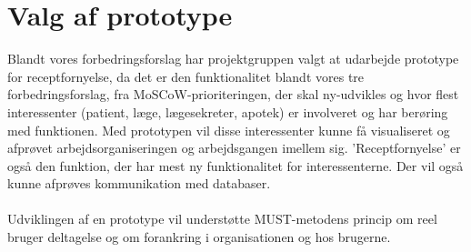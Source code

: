 \section{Valg af prototype}
Blandt vores forbedringsforslag har projektgruppen valgt at udarbejde prototype for receptfornyelse, da det er den funktionalitet blandt vores tre forbedringsforslag, fra MoSCoW-prioriteringen, der skal ny-udvikles og hvor flest interessenter (patient, læge, lægesekreter, apotek) er involveret og har berøring med funktionen. Med prototypen vil disse interessenter kunne få visualiseret og afprøvet arbejdsorganiseringen og arbejdsgangen imellem sig. ’Receptfornyelse’ er også den funktion, der har mest ny funktionalitet for interessenterne. 
Der vil også kunne afprøves kommunikation med databaser. \\ 
\\
Udviklingen af en prototype vil understøtte MUST-metodens princip om reel bruger deltagelse og om forankring i organisationen og hos brugerne.
%
%
